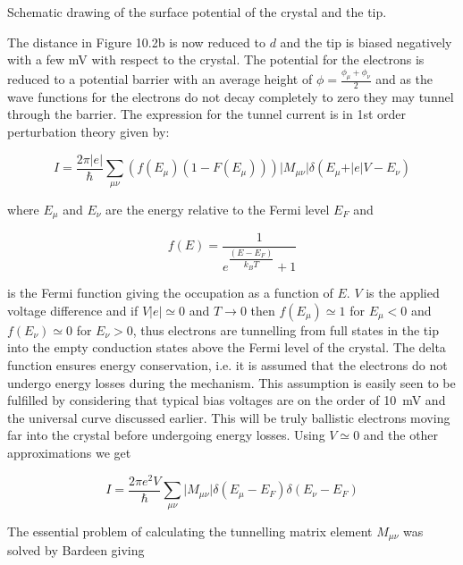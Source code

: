 \vspace*{11cm}

 Schematic drawing of the surface potential of the crystal and the tip.

\vspace{1cm}

The  distance in Figure 10.2b is now reduced to $d$ and the tip is biased negatively with a few \si{mV} with respect to the crystal. The potential for the electrons is reduced to a potential barrier with an average height of $\phi=\frac{\phi_{\mu}+\phi_{\nu}}{2}$ and as the wave functions for the electrons do not decay completely to zero they  may tunnel through the barrier. The expression for the tunnel current is in 1st order perturbation theory given by:

\begin{equation}
I=\frac{2\pi\vert e\vert}{\hbar}\sum_{\mu \nu}(f(E_{\mu})(1-F(E_{\mu})))\vert M_{\mu\nu}\vert\delta(E_{\mu}+\vert e\vert V-E_{\nu})
\end{equation}

\noindent where $E_{\mu}$ and $E_{\nu}$ are the energy relative to the Fermi level $E_F$ and

\begin{equation}
f(E)=\frac{1}{e^{\dfrac{(E-E_F)}{k_BT}}+1}
\end{equation}

\noindent is the Fermi function giving the occupation as a function of $E$. $V$ is the applied voltage difference and if $V\vert e\vert\simeq 0$ and $T \rightarrow 0$ then $f(E_{\mu}) \simeq 1$ for $E_{\mu}<0$ and $f(E_{\nu})\simeq 0$ for $E_{\nu}>0$, thus electrons are tunnelling from full states in the tip into the empty conduction states above the Fermi level of the crystal. The delta function ensures energy conservation, i.e. it is assumed that the electrons do not undergo energy losses during the mechanism. This assumption is easily seen to be fulfilled  by considering that typical bias voltages are on the order of \SI{10}{mV} and the universal curve discussed earlier. This will be truly ballistic electrons moving far into the crystal before undergoing energy losses. Using  $V\simeq 0$ and the other  approximations we get 

\begin{equation}
I=\frac{2\pi e^2V}{\hbar}\sum_{\mu\nu}\vert M_{\mu\nu}\vert\delta(E_{\mu}-E_F)\delta(E_{\nu}-E_F)
\end{equation}

The essential problem of calculating the tunnelling matrix element $M_{\mu\nu}$ was solved by Bardeen \cite{Bardeen} giving

